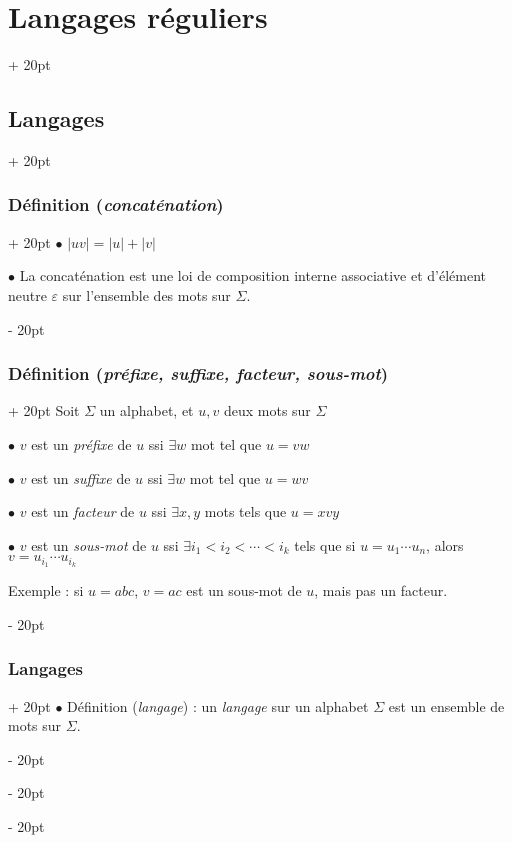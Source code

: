 \documentclass[a4paper, 12pt, twoside]{article}
\newcommand{\abs}[1]{\left\lvert #1 \right\rvert}
\newcommand{\ind}[1][20pt]{\advance\leftskip + #1}
\newcommand{\deind}[1][20pt]{\advance\leftskip - #1}
\newenvironment{indt}[2][20pt]{#2 \par \ind[#1]}{\par \deind} %
\begin{document}
\begin{indt}{\section{Langages réguliers}}
\begin{indt}{\subsection{Langages}}
\begin{indt}{\subsubsection{Définition (\textit{concaténation})}}
                $\bullet$ $\abs{uv} = \abs u + \abs v$

                $\bullet$ La concaténation est une loi de composition interne associative et d'élément neutre $\varepsilon$ sur l'ensemble des mots sur $\Sigma$.
            \end{indt}

            \vspace{12pt}
            
            \begin{indt}{\subsubsection{Définition (\textit{préfixe, suffixe, facteur, sous-mot})}}
                Soit $\Sigma$ un alphabet, et $u, v$ deux mots sur $\Sigma$

                \vspace{6pt}
                
                $\bullet$ $v$ est un \emph{préfixe} de $u$ ssi $\exists w$ mot tel que $u = vw$

                $\bullet$ $v$ est un \emph{suffixe} de $u$ ssi $\exists w$ mot tel que $u = wv$

                $\bullet$ $v$ est un \emph{facteur} de $u$ ssi $\exists x, y$ mots tels que $u = xvy$

                $\bullet$ $v$ est un \emph{sous-mot} de $u$ ssi $\exists i_1 < i_2 < \cdots < i_k$ tels que si $u = u_1 \cdots u_n$, alors $v = u_{i_1} \cdots u_{i_k}$

                \vspace{12pt}
                
                Exemple : si $u = abc$, $v = ac$ est un sous-mot de $u$, mais pas un facteur.
            \end{indt}

            \vspace{12pt}
            
            \begin{indt}{\subsubsection{Langages}}
                $\bullet$ Définition (\textit{langage}) : un \emph{langage} sur un alphabet $\Sigma$ est un ensemble de mots sur $\Sigma$.

                \vspace{12pt}
                

\end{indt}
\end{indt}
\end{indt}
\end{document}
